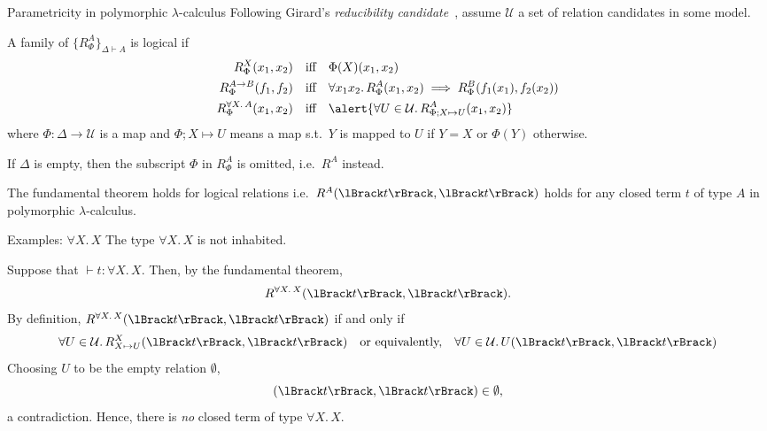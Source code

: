 \begin{frame}{Parametricity in polymorphic $\lambda$-calculus}
  Following Girard's \emph{reducibility candidate}~\cite{Girard1989}, assume $\mathcal{U}$ a set of \alert{relation candidates} in some model.

  A family of $\{ R_{\Phi}^{A} \}_{\Delta \vdash A}$ is logical if
  \begin{align*}
    R^{X}_{\Phi}(x_1, x_2)        & \quad\text{iff} \quad\Phi(X)(x_1, x_2)  \\
    R^{A \to B}_{\Phi}(f_1, f_2)  & \quad \text{iff} \quad \forall x_1 x_2.\, R^{A}_{\Phi}(x_1, x_2) \implies R^{B}_{\Phi}(f_1(x_1), f_2(x_2)) \\
    R^{\forall X.\, A}_{\Phi}(x_1, x_2) & \quad\text{iff}\quad \alert{\forall U \in \mathcal{U}.\, R^{A}_{\Phi; X \mapsto U}(x_1, x_2)}
  \end{align*}
  where $\Phi\colon \Delta \to \mathcal{U}$ is a map and $\Phi; X \mapsto U$ means a map s.t.\ $Y$ is mapped to $U$ if $Y = X$ or $\Phi(Y)$ otherwise.

  If $\Delta$ is empty, then the subscript $\Phi$ in $R^A_{\Phi}$ is omitted, i.e.\ $R^A$ instead.
  \begin{theorem}
    The fundamental theorem holds for logical relations i.e.\ $R^A(\Brackets{t}, \Brackets{t})$ holds for any closed term $t$ of type $A$ in polymorphic $\lambda$-calculus. 
  \end{theorem}
  
\end{frame}

\begin{frame}{Examples: $\forall X.\, X$}
  The type $\forall X.\, X$ is not inhabited.

  Suppose that $\vdash t : \forall X.\, X$.
  Then, by the fundamental theorem,
  \[
    R^{\forall X.\, X}(\Brackets{t}, \Brackets{t}).
  \]
  By definition, $R^{\forall X.\, X}(\Brackets{t}, \Brackets{t})$ if and only if
  \[
    \forall U \in \mathcal{U}.\, R^X_{X \mapsto U}(\Brackets{t}, \Brackets{t})
    \quad\text{or equivalently,}\quad
    \forall U \in \mathcal{U}.\, U(\Brackets{t}, \Brackets{t})
  \]
  Choosing $U$ to be the empty relation $\emptyset$,
  \[
    (\Brackets{t}, \Brackets{t}) \in \emptyset,
  \]
  a contradiction.
  Hence, there is \emph{no} closed term of type $\forall X.\, X$.
\end{frame}

